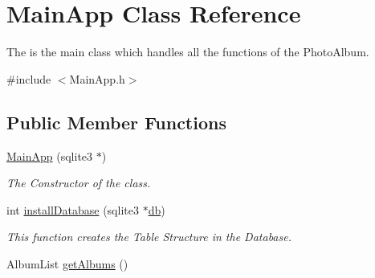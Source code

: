\hypertarget{classMainApp}{\section{Main\-App Class Reference}
\label{de/dab/classMainApp}
}


The is the main class which handles all the functions of the Photo\-Album.  




{\ttfamily \#include $<$Main\-App.\-h$>$}

\subsection*{Public Member Functions}
\begin{DoxyCompactItemize}
\item 
\hyperlink{classMainApp_afcefd66bc2349987c371ddd0e6a0addd}{Main\-App} (sqlite3 $\ast$)
\begin{DoxyCompactList}\small\item\em The Constructor of the class. \end{DoxyCompactList}\item 
int \hyperlink{classMainApp_a4dd4e6d997e6a82c2cf838b1ce8e7ba7}{install\-Database} (sqlite3 $\ast$\hyperlink{classMainApp_a2d0975ce785555e698fb85c697f303bd}{db})
\begin{DoxyCompactList}\small\item\em This function creates the Table Structure in the Database. \end{DoxyCompactList}\item 
\hypertarget{classMainApp_a37b5c154528582e649ccdd21ba7fb301}{Album\-List \hyperlink{classMainApp_a37b5c154528582e649ccdd21ba7fb301}{get\-Albums} ()}\label{de/dab/classMainApp_a37b5c154528582e649ccdd21ba7fb301}


\end{DoxyCompactItemize}
